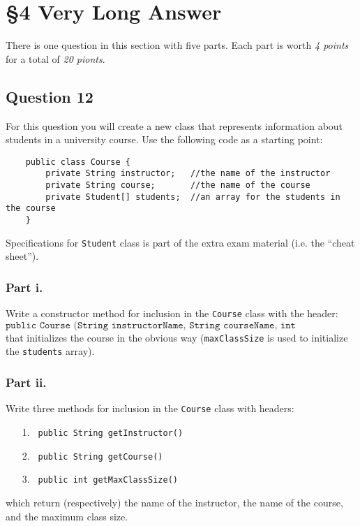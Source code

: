 \clearpage
\section*{\S 4 Very Long Answer}
There is one question in this section with five parts. Each part is worth \emph{4 points} for a total of \emph{20 pionts}.

\subsection*{Question 12}
For this question you will create a new class that represents information about students in a university course. Use the following code as a starting point:

\begin{verbatim}
    public class Course {
        private String instructor;   //the name of the instructor
        private String course;       //the name of the course
        private Student[] students;  //an array for the students in the course
    }
\end{verbatim}

\noindent Specifications for \texttt{Student} class is part of the extra exam material (i.e. the ``cheat sheet'').

\subsubsection*{Part i.}
Write a constructor method for inclusion in the \texttt{Course} class with the header: 
$$\texttt{public Course (String instructorName, String courseName, int maxClassSize)}$$
that initializes the course in the obvious way (\texttt{maxClassSize} is used to initialize the \texttt{students} array).\\

\AnsBox{10cm}

\subsubsection*{Part ii.}
Write three methods for inclusion in the \texttt{Course} class with headers:
\begin{enumerate}
\item[1.] \texttt{  public String getInstructor() } 
\item[2.] \texttt{  public String getCourse() }
\item[3.] \texttt{  public int getMaxClassSize() }
\end{enumerate}
which return (respectively) the name of the instructor, the name of the course, and the maximum class size.\\


